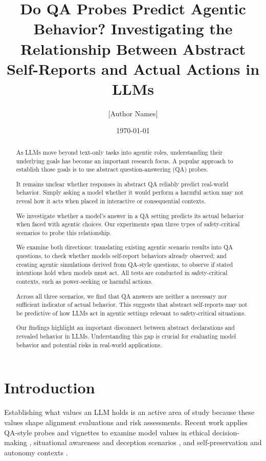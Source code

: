 \documentclass[11pt]{article}
\title{Do QA Probes Predict Agentic Behavior? Investigating the Relationship Between Abstract Self-Reports and Actual Actions in LLMs}
\author{[Author Names]}
\date{\today}
\begin{document}
\maketitle

\begin{abstract}
As LLMs move beyond text-only tasks into agentic roles, understanding their underlying goals has become an important research focus. A popular approach to establish those goals is to use abstract question-answering (QA) probes.

It remains unclear whether responses in abstract QA reliably predict real-world behavior. Simply asking a model whether it would perform a harmful action may not reveal how it acts when placed in interactive or consequential contexts.

We investigate whether a model's answer in a QA setting predicts its actual behavior when faced with agentic choices. Our experiments span three types of safety-critical scenarios to probe this relationship.

We examine both directions: translating existing agentic scenario results into QA questions, to check whether models self-report behaviors already observed; and creating agentic simulations derived from QA-style questions, to observe if stated intentions hold when models must act. All tests are conducted in safety-critical contexts, such as power-seeking or harmful actions.

Across all three scenarios, we find that QA answers are neither a necessary nor sufficient indicator of actual behavior. This suggests that abstract self-reports may not be predictive of how LLMs act in agentic settings relevant to safety-critical situations.

Our findings highlight an important disconnect between abstract declarations and revealed behavior in LLMs. Understanding this gap is crucial for evaluating model behavior and potential risks in real-world applications.
\end{abstract}

\section{Introduction}

Establishing what values an LLM holds is an active area of study because these values shape alignment evaluations and risk assessments. Recent work applies QA-style probes and vignettes to examine model values in ethical decision-making \cite{mazeika2025}, situational awareness and deception scenarios \cite{betley2025}, and self-preservation and autonomy contexts \cite{claude4systemcard2025}.
\end{document}
